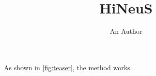 \documentclass{article}
\title{HiNeuS}
\author{An Author}
\begin{document}
\maketitle
As shown in \ref{fig:teaser}, the method works.
\end{document}
